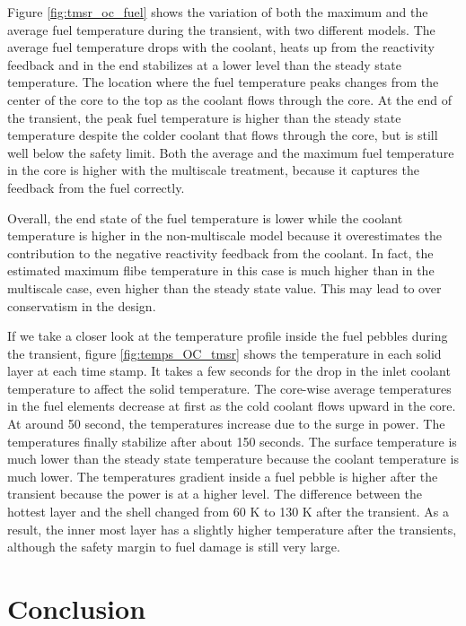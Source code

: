 \documentclass{elsarticle}
\begin{document}
Figure \ref{fig:tmsr_oc_fuel} shows the variation of both the maximum and the average fuel temperature during the transient, with two different models.
The average fuel temperature drops with the coolant, heats up from the reactivity feedback and in the end stabilizes at a lower level than the steady state temperature.
The location where the fuel temperature peaks changes from the center of the core to the top as the coolant flows through the core. At the end of the transient, the peak fuel temperature is higher than the steady state temperature despite the colder coolant that flows through the core, but is still well below the safety limit. 
Both the average and the maximum fuel temperature in the core is higher with the multiscale treatment, because it captures the feedback from the fuel correctly. 

Overall, the end state of the fuel temperature is lower while the coolant temperature is higher in the non-multiscale model because it overestimates the contribution to the negative reactivity feedback from the coolant. 
In fact, the estimated maximum flibe temperature in this case is much higher than in the multiscale case, even higher than the steady state value. This may lead to over conservatism in the design. 


If we take a closer look at the temperature profile inside the fuel pebbles during the transient, figure \ref{fig:temps_OC_tmsr} shows the temperature in each solid layer at each time stamp.
It takes a few seconds for the drop in the inlet coolant temperature to affect the solid temperature. The core-wise average temperatures in the fuel elements decrease at first as the cold coolant flows upward in the core.
At around 50 second, the temperatures increase due to the surge in power. The temperatures finally stabilize after about 150 seconds. The surface temperature is much lower than the steady state temperature because the coolant temperature is much lower.
The temperatures gradient inside a fuel pebble is higher after the transient because the power is at a higher level. The difference between the hottest layer and the shell changed from 60 K to 130 K after the transient. As a result, the inner most layer has a slightly higher temperature after the transients, although the safety margin to fuel damage is still very large. 






\newpage

\section{Conclusion}
\end{document}
